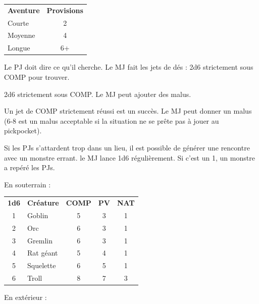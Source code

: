 \begin{frame}[b]
{\begin{minipage}[c][0.95\textheight][c]{\linewidth}
\begin{table}
\begin{tabular}{lc}
\textbf{Aventure} & \textbf{Provisions} \\
Courte & 2 \\
Moyenne & 4 \\
Longue & 6+ \\
\end{tabular}
\end{table}


\myindent Le PJ doit dire ce qu'il cherche. Le MJ fait les jets de dés : 2d6 strictement sous COMP pour trouver.


\myindent 2d6 strictement sous COMP. Le MJ peut ajouter des malus.


\myindent Un jet de COMP strictement réussi est un succès. Le MJ peut donner un malus (6-8 est un malus acceptable si la situation ne se prête pas à jouer au pickpocket).


\myindent Si les PJs s'attardent trop dans un lieu, il est possible de générer une rencontre avec un monstre errant. le MJ lance 1d6 régulièrement. Si c'est un 1, un monstre a repéré les PJs.

\myindent En souterrain :

\begin{center}
\begin{tabular}{clccc}
\textbf{1d6} &  \textbf{Créature} &  \textbf{COMP} &  \textbf{PV} &  \textbf{NAT} \\
    1 & Goblin     &      5 &    3 &     1 \\
    2 & Orc        &      6 &    3 &     1 \\
    3 & Gremlin    &      6 &    3 &     1 \\
    4 & Rat géant  &      5 &    4 &     1 \\
    5 & Squelette  &      6 &    5 &     1 \\
    6 & Troll      &      8 &    7 &     3 \\
\end{tabular}
\end{center}

\myindent En extérieur :


\end{minipage}}
\end{frame}
